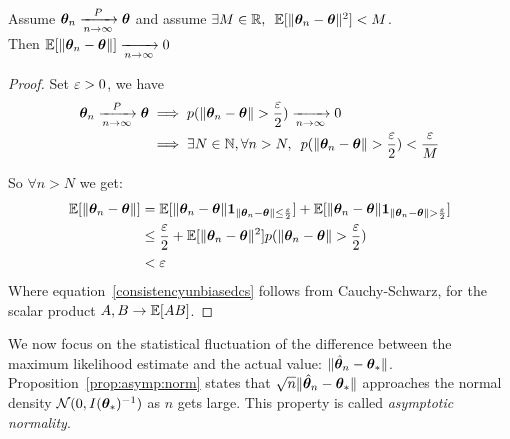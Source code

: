 \begin{proposition}
  \label{prop:consistency_unbiasedness}
  Assume $\boldsymbol{\theta}_n\xrightarrow[n \rightarrow \infty]{P} \boldsymbol{\theta}$ and assume
  $\exists M \in \mathbb{R}, \enspace \mathbb{E}[\|\boldsymbol{\theta}_n - \boldsymbol{\theta}\|^2] < M$. \\
  Then $\mathbb{E}[\|\boldsymbol{\theta}_n - \boldsymbol{\theta}\|] \xrightarrow[n \rightarrow \infty]{} 0$
\end{proposition}
\begin{proof}
  Set $\varepsilon > 0$, we have
  \begin{align}
    \boldsymbol{\theta}_n\xrightarrow[n \rightarrow \infty]{P} \boldsymbol{\theta} &\implies p(\|\boldsymbol{\theta}_n - \boldsymbol{\theta}\| > \frac{\varepsilon}{2}) \xrightarrow[n \rightarrow
                                                             \infty]{}0\\
                                                           &\implies \exists N \in \mathbb{N}, \forall n > N, \enspace
                                                             p(\|\boldsymbol{\theta}_n - \boldsymbol{\theta}\| > \frac{\varepsilon}{2}) < \frac{\varepsilon}{M}
  \end{align}

  So $\forall n > N$ we get:
  \begin{align}
    \mathbb{E}[\|\boldsymbol{\theta}_n - \boldsymbol{\theta}\|] &= \mathbb{E}[\|\boldsymbol{\theta}_n - \boldsymbol{\theta}\| \boldsymbol{1}_{\|\boldsymbol{\theta}_n - \boldsymbol{\theta}\| \leq \frac{\varepsilon}{2}}] + \mathbb{E}[\|\boldsymbol{\theta}_n - \boldsymbol{\theta}\| \boldsymbol{1}_{\|\boldsymbol{\theta}_n - \boldsymbol{\theta}\|  > \frac{\varepsilon}{2}}] \\
                                 &\leq  \frac{\varepsilon}{2} + \mathbb{E}[\|\boldsymbol{\theta}_n - \boldsymbol{\theta}\|^2]p(\|\boldsymbol{\theta}_n - \boldsymbol{\theta}\|  > \frac{\varepsilon}{2}) \label{consistencyunbiasedcs} \\
                                   &< \varepsilon
  \end{align}
  Where equation~\eqref{consistencyunbiasedcs} follows from Cauchy-Schwarz, for the scalar product $A, B \rightarrow \mathbb{E}[AB]$.
\end{proof}

We now focus on the statistical fluctuation of the difference between the
maximum likelihood estimate and the actual value: $\|\hat{\boldsymbol{\theta}}_n -
\boldsymbol{\theta}_*\|$. Proposition~\ref{prop:asymp:norm} states that
$\sqrt{n}\|\hat{\boldsymbol{\theta}}_n - \boldsymbol{\theta}_*\|$ approaches the normal density
$\mathcal{N}(0, I(\boldsymbol{\theta}_*)^{-1})$ as $n$ gets large. This property is called \emph{asymptotic normality}.

